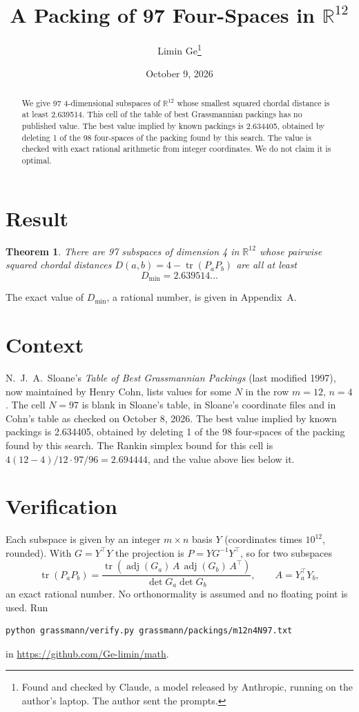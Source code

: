 \documentclass[11pt,a4paper]{article}
\title{A Packing of 97 Four-Spaces in $\mathbb{R}^{12}$}
\author{Limin Ge\thanks{Found and checked by Claude, a model released by Anthropic, running on the author's laptop. The author sent the prompts.}}
\date{October 9, 2026}
\newtheorem*{theorem}{Theorem}
\begin{document}
\maketitle
\begin{abstract}
We give 97 4-dimensional subspaces of $\mathbb{R}^{12}$ whose smallest squared chordal distance is at least 2.639514. This cell of the table of best Grassmannian packings has no published value. The best value implied by known packings is 2.634405, obtained by deleting 1 of the 98 four-spaces of the packing found by this search. The value is checked with exact rational arithmetic from integer coordinates. We do not claim it is optimal.
\end{abstract}

\section{Result}
\begin{theorem}
There are 97 subspaces of dimension 4 in $\mathbb{R}^{12}$ whose pairwise squared chordal distances $D(a,b) = 4 - \operatorname{tr}(P_aP_b)$ are all at least
\[ D_{\min} = 2.639514\ldots \]
\end{theorem}
The exact value of $D_{\min}$, a rational number, is given in Appendix~A.


\section{Context}
N.~J.~A.~Sloane's \emph{Table of Best Grassmannian Packings} (last modified 1997), now maintained by Henry Cohn, lists values for some $N$ in the row $m=12$, $n=4$. The cell $N=97$ is blank in Sloane's table, in Sloane's coordinate files and in Cohn's table as checked on October 8, 2026. The best value implied by known packings is 2.634405, obtained by deleting 1 of the 98 four-spaces of the packing found by this search. The Rankin simplex bound for this cell is $4(12-4)/12\cdot 97/96 = 2.694444$, and the value above lies below it.


\section{Verification}
Each subspace is given by an integer $m\times n$ basis $Y$ (coordinates times $10^{12}$, rounded). With $G=Y^\top Y$ the projection is $P=YG^{-1}Y^\top$, so for two subspaces
\[ \operatorname{tr}(P_aP_b)=\frac{\operatorname{tr}(\operatorname{adj}(G_a)\,A\,\operatorname{adj}(G_b)\,A^\top)}{\det G_a\det G_b},\qquad A=Y_a^\top Y_b, \]
an exact rational number. No orthonormality is assumed and no floating point is used. Run
\begin{verbatim}
python grassmann/verify.py grassmann/packings/m12n4N97.txt
\end{verbatim}
in \url{https://github.com/Ge-limin/math}.
\end{document}

